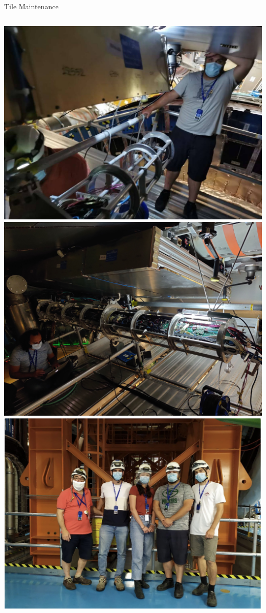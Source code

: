 \documentclass[aspectratio=169,xcolor=table]{beamer}
\begin{document}
\begin{frame}[t]{Tile Maintenance}
\begin{columns}
        \centering
        \includegraphics[height=.3\textheight,keepaspectratio=true]{OnLBA14.jpg}
        \includegraphics[height=.3\textheight,keepaspectratio=true]{TileElectronicsJalal.jpg}
        \includegraphics[height=.5\textheight,keepaspectratio=true]{TileMaintenanceTeamJune2020.png}
      \end{columns}
    \end{frame}
\end{document}
